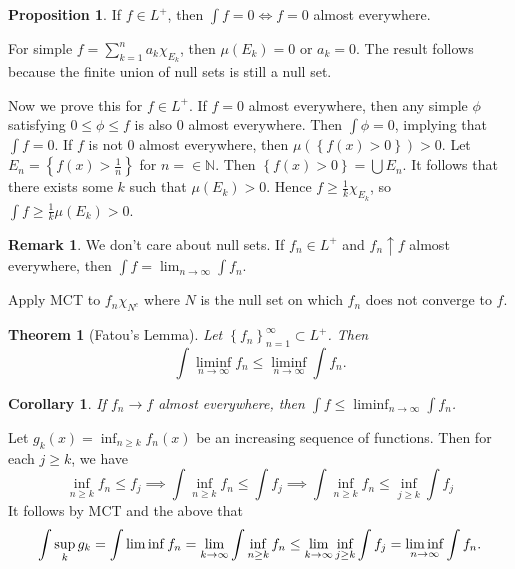 \documentclass[11pt]{article}
\newtheorem{thm}{Theorem}[section]
\newtheorem{cor}{Corollary}[thm]
\theoremstyle{definition}
\newtheorem{prop}{Proposition}[section]
\newtheorem{remark}{Remark}[section]
\newcommand{\set}[1]{\left\{ #1 \right\}}
\newcommand{\NN}{\mathbb{N}}
\begin{document}

\begin{prop}
  If $f\in L^+$, then $\int f=0 \iff f=0$ almost everywhere. 
\end{prop}
\proof
For simple $f=\sum_{k=1}^na_k\chi_{E_k}$, then $\mu(E_k)=0$ or $a_k=0$. The result follows
because the finite union of null sets is still a null set.

Now we prove this for $f\in L^+$. If $f=0$ almost everywhere, then
any simple $\phi$ satisfying $0\le\phi\le f$ is also 0 almost everywhere. Then
$\int\phi=0$, implying that $\int f=0$. If $f$ is not 0 almost everywhere, then
$\mu(\set{f(x)>0})>0$. Let $E_n=\set{f(x)>\frac1n}$ for $n=\in\NN$. Then
$\set{f(x)>0}=\bigcup E_n$. It follows that there exists some $k$ such that $\mu(E_k)>0$.
Hence $f\ge\frac1k\chi_{E_k}$, so $\int f \ge \frac1k\mu(E_k) > 0$.
\qedhere

\begin{remark}
  We don't care about null sets. If $f_n\in L^+$ and $f_n\uparrow f$ almost everywhere,
  then $\int f = \lim_{n\to\infty}\int f_n$. 
\end{remark}
\proof
Apply MCT to $f_n\chi_{N^c}$ where $N$ is the null set on which $f_n$ does not converge to
$f$. 
\qedhere

\begin{thm}[Fatou's Lemma]
  Let $\set{f_n}_{n=1}^\infty\subset L^+$. Then 
  \[
    \int\liminf_{n\to\infty}f_n \le \liminf_{n\to\infty}\int f_n .
  \]
\end{thm}
\begin{cor}
  If $f_n\to f$ almost everywhere, then $\int f \le \liminf_{n\to\infty} \int f_n$. 
\end{cor}

Let $g_k(x)=\inf_{n\ge k}f_n(x)$ be an increasing sequence of functions. 
Then for each $j\ge k$, we have
\[
  \inf_{n\ge k}f_n \le f_j \implies \int\inf_{n\ge k}f_n \le \int f_j
  \implies \int\inf_{n\ge k}f_n \le \inf_{j\ge k}\int f_j
\]
It follows by MCT and the above that
\[
  \int\sup_kg_k = \int\liminf f_n = \lim_{k\to\infty}\int\inf_{n\ge k}f_n \\
  \le \lim_{k\to\infty}\inf_{j\ge k}\int f_j = \liminf_{n\to\infty}\int f_n .
\]
\qedhere

\end{document}

